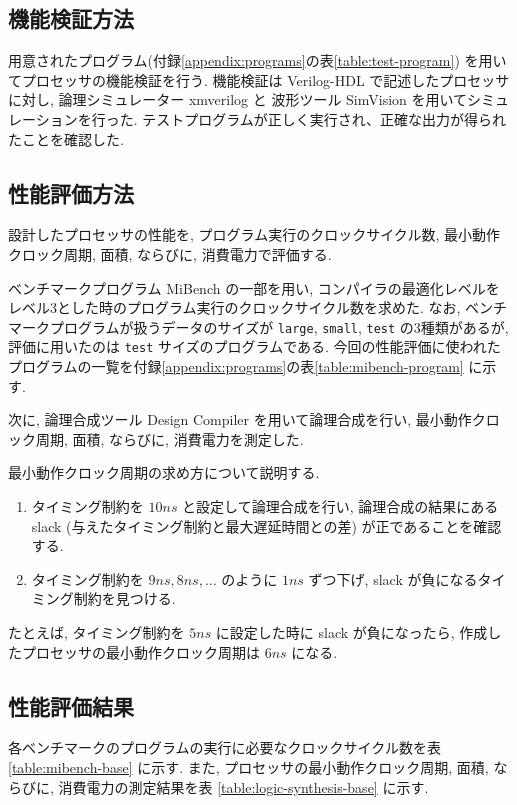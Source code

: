 \documentclass[../main.tex]{subfiles}
\begin{document}
  \subsection{機能検証方法}
  用意されたプログラム(付録\ref{appendix:programs}の表\ref{table:test-program})
  を用いてプロセッサの機能検証を行う.
  機能検証は Verilog-HDL で記述したプロセッサに対し, 
  論理シミュレーター xmverilog と
  波形ツール SimVision を用いてシミュレーションを行った.
  テストプログラムが正しく実行され、正確な出力が得られたことを確認した.

  \subsection{性能評価方法}
  設計したプロセッサの性能を, プログラム実行のクロックサイクル数, 
  最小動作クロック周期, 面積, ならびに, 消費電力で評価する.

  ベンチマークプログラム MiBench \cite{mibench} の一部を用い, 
  コンパイラの最適化レベルをレベル3とした時のプログラム実行のクロックサイクル数を求めた.
  なお, ベンチマークプログラムが扱うデータのサイズが \verb|large|, \verb|small|, \verb|test| の3種類があるが, 
  評価に用いたのは \verb|test| サイズのプログラムである.
  今回の性能評価に使われたプログラムの一覧を付録\ref{appendix:programs}の表\ref{table:mibench-program} に示す.

  次に, 論理合成ツール Design Compiler を用いて論理合成を行い, 
  最小動作クロック周期, 面積, ならびに, 消費電力を測定した.

  最小動作クロック周期の求め方について説明する.
  \begin{enumerate}
    \item タイミング制約を $10\unit{ns}$ と設定して論理合成を行い, 
    論理合成の結果にある slack (与えたタイミング制約と最大遅延時間との差) が正であることを確認する.
    \item タイミング制約を $9\unit{ns}, 8\unit{ns}, \ldots$ のように $1\unit{ns}$ ずつ下げ, 
    slack が負になるタイミング制約を見つける.
  \end{enumerate}

  たとえば, タイミング制約を $5\unit{ns}$ に設定した時に slack が負になったら, 
  作成したプロセッサの最小動作クロック周期は $6\unit{ns}$ になる.

  \subsection{性能評価結果}
  各ベンチマークのプログラムの実行に必要なクロックサイクル数を表 \ref{table:mibench-base} に示す.
  また, プロセッサの最小動作クロック周期, 面積, ならびに, 消費電力の測定結果を表 \ref{table:logic-synthesis-base} に示す.
\end{document}

